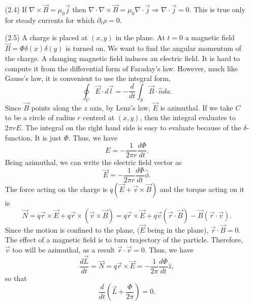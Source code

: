 \documentclass{article}
\begin{document}
\begin{enumerate}
\item[(2.4)] If $\nabla\times\vec{B} = \mu_0\vec{j}$ then 
$\nabla\cdot\nabla\times\vec{B} = \mu_0\nabla\cdot\vec{j} \Rightarrow 
\nabla\cdot\vec{j} = 0$. This is true only for steady currents for which 
$\partial_t\rho = 0$.

\item[(2.5)] A charge is placed at $(x, y)$ in the plane. At $t = 0$ a magnetic field $\vec{B} = \Phi\delta(x)\delta(y)$ is
turned on. We want to find the angular momentum of the charge. A changing magnetic field induces an electric field. It is hard
to compute it from the differential form of Faraday's law. However, much like Gauss's law, it is convenient to use the integral
form,
\[
\oint_C \vec{E}\cdot d\vec{l} = -\frac{d}{dt}\int_S\vec{B}\cdot\hat{n}da.
\]
Since $\vec{B}$ points along the $z$ axis, by Lenz's law, $\vec{E}$ is azimuthal. If we take $C$ to be a circle of radius
$r$ centred at $(x, y)$, then the integral evaluates to $2\pi r E$. The integral on the right hand side is easy to evaluate
because of the $\delta$-function. It is just $\Phi$. Thus, we have
\[
E = -\frac{1}{2\pi r}\frac{d\Phi}{dt}.
\]
Being azimuthal, we can write the electric field vector as
\begin{equation}
\vec{E} = -\frac{1}{2\pi r}\frac{d\Phi}{dt}\hat{\phi}.
\end{equation}
The force acting on the charge is $q(\vec{E} + \vec{v} \times \vec{B})$ and the torque acting on it is
\[
\vec{N} = q\vec{r} \times \vec{E} + q\vec{r} \times (\vec{v} \times \vec{B})
= q\vec{r} \times \vec{E} + q\vec{v}(\vec{r}\cdot\vec{B}) - \vec{B}(\vec{r}\cdot\vec{v}).
\]
Since the motion is confined to the plane, ($\vec{E}$ being in the plane), $\vec{r}\cdot\vec{B} = 0$. The effect of a magnetic
field is to turn trajectory of the particle. Therefore, $\vec{v}$ too will be azimuthal, as a result $\vec{r}\cdot\vec{v} = 0$.
Thus, we have
\begin{equation}
\frac{d\vec{L}}{dt} = \vec{N} = q\vec{r}\times\vec{E} = -\frac{1}{2\pi}\frac{d\Phi}{dt}\hat{z},
\end{equation}
so that
\begin{equation}
\frac{d}{dt}\left(\vec{L} + \frac{\Phi}{2\pi}\right) = 0.
\end{equation}


\end{enumerate}
\end{document}
